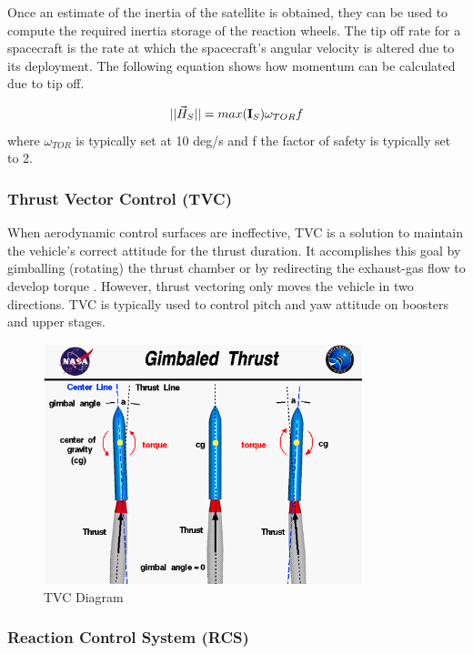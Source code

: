 Once an estimate of the inertia of the satellite is obtained, they can
be used to compute the required inertia storage of the reaction wheels. The 
tip off rate for a spacecraft is the rate at which the spacecraft’s
angular velocity is altered due to its deployment. The following
equation shows how momentum can be calculated due to tip off.

\begin{equation}
||\vec{H}_S|| = max({\bf I}_S)\omega_{TOR}f
\end{equation}
where $\omega_{TOR}$ is typically set at 10 deg/s and f the factor of
safety is typically set to 2.

\subsubsection{Thrust Vector Control (TVC)}

When aerodynamic control surfaces are ineffective, TVC is a solution
to maintain the vehicle's correct attitude for the thrust duration. It
accomplishes this goal by gimballing (rotating) the thrust chamber or
by redirecting the exhaust-gas flow to develop torque \cite{qp21}. However,
thrust vectoring only moves the vehicle in two directions. TVC is
typically used to control pitch and yaw attitude on boosters and upper
stages.
\begin{figure}[H]
  \begin{center}
  \includegraphics[height=70mm]{Figures/TVS}
  \end{center}
  \caption{TVC Diagram\cite{qp22}}
\end{figure}

\subsubsection{Reaction Control System (RCS)}

